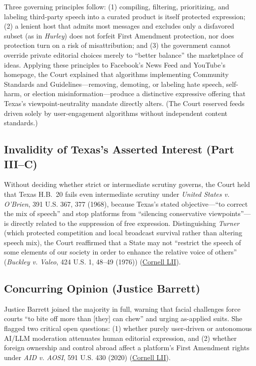 \documentclass[12pt]{article}
\begin{document}
Three governing principles follow: (1) compiling, filtering, prioritizing, and labeling third-party speech into a curated product is itself protected expression; (2) a lenient host that admits most messages and excludes only a disfavored subset (as in \textit{Hurley}) does not forfeit First Amendment protection, nor does protection turn on a risk of misattribution; and (3) the government cannot override private editorial choices merely to ``better balance'' the marketplace of ideas. Applying these principles to Facebook's News Feed and YouTube's homepage, the Court explained that algorithms implementing Community Standards and Guidelines---removing, demoting, or labeling hate speech, self-harm, or election misinformation---produce a distinctive expressive offering that Texas's viewpoint-neutrality mandate directly alters. (The Court reserved feeds driven solely by user-engagement algorithms without independent content standards.)

\subsection{Invalidity of Texas's Asserted Interest (Part III--C)}
Without deciding whether strict or intermediate scrutiny governs, the Court held that Texas H.B.~20 fails even intermediate scrutiny under \textit{United States v. O'Brien}, 391 U.S. 367, 377 (1968), because Texas's stated objective---``to correct the mix of speech'' and stop platforms from ``silencing conservative viewpoints''---is directly related to the suppression of free expression. Distinguishing \textit{Turner} (which protected competition and local broadcast survival rather than altering speech mix), the Court reaffirmed that a State may not ``restrict the speech of some elements of our society in order to enhance the relative voice of others'' (\textit{Buckley v. Valeo}, 424 U.S. 1, 48--49 (1976)) (\href{https://www.law.cornell.edu/supremecourt/text/22-277}{Cornell LII}).

\subsection{Concurring Opinion (Justice Barrett)}

Justice Barrett joined the majority in full, warning that facial challenges force courts ``to bite off more than [they] can chew'' and urging as-applied suits. She flagged two critical open questions: (1) whether purely user-driven or autonomous AI/LLM moderation attenuates human editorial expression, and (2) whether foreign ownership and control abroad affect a platform's First Amendment rights under \textit{AID v. AOSI}, 591 U.S. 430 (2020) (\href{https://www.law.cornell.edu/supremecourt/text/22-277}{Cornell LII}).
\end{document}
